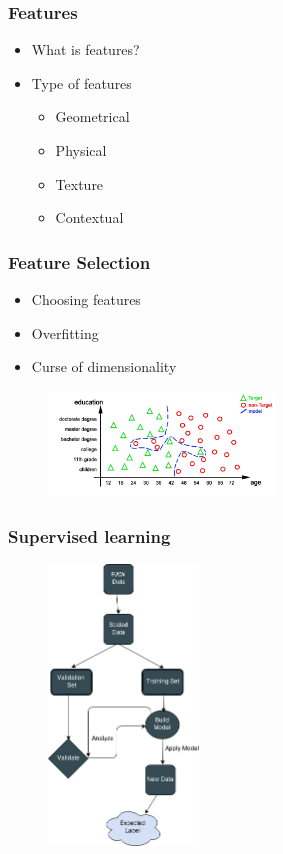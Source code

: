 \documentclass{beamer}
\begin{document}
\begin{frame}
\frametitle{Features}
\begin{itemize}
	\item What is features?
	\item Type of features \begin{itemize}
					\item Geometrical %
					\item Physical %
					\item Texture %
					\item Contextual  %
					\end{itemize}
				
\end{itemize}

\end{frame}


\begin{frame}
\frametitle{Feature Selection}
\begin{itemize}
	\item Choosing features
	\item Overfitting 
	\item Curse of dimensionality
\end{itemize}
\begin{figure}
	\centering
    \includegraphics[width=60mm,scale=1.5]{./img/overfit.png}
\end{figure}
\end{frame}

\begin{frame}
\frametitle{Supervised learning}

\begin{figure}
	\centering
    \includegraphics[width=40mm,scale=1]{./img/SL.png}
\end{figure}

\end{frame}
\end{document}
